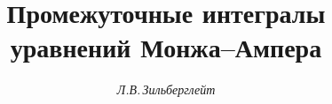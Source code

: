 









\newcommand{\Diff}{\text{\bf Diff\,}}


\newcommand{\BBR}{\mathrm{I\!R}}


\newcommand{\const}{\operatorname{const}}


\newcommand{\cl}{\operatorname{cl}}


\newcommand{\Mod}{\operatorname{mod}}


\newcommand{\Ann}{\operatorname{Ann}}


\newcommand{\Pf}{\operatorname{Pf}}


\newcommand{\Ker}{\operatorname{Ker}}


\newcommand{\Char}{\operatorname{Char}}


\newcommand{\tts}[1]{}







 


\setcounter{page}{16}















\author{\it Л.В.\,Зильберглейт}




\title{Промежуточные интегралы уравнений Монжа--Ампера}





\date{}


